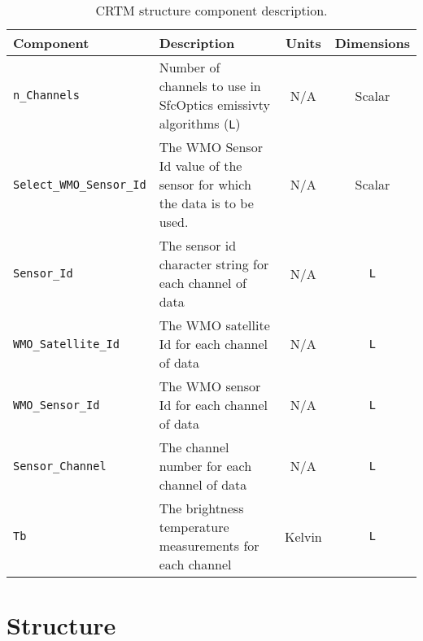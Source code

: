 \begin{table}[htp]
  \centering
  \begin{tabular}{l p{7cm} c c}
    \hline
    \sffamily\textbf{Component} & \sffamily\textbf{Description} & \sffamily\textbf{Units} & \sffamily\textbf{Dimensions} \\
    \hline\hline
    \texttt{n\_Channels} & Number of channels to use in SfcOptics emissivty algorithms (\texttt{L}) & N/A & Scalar \\
    \texttt{Select\_WMO\_Sensor\_Id} & The WMO Sensor Id value of the sensor for which the data is to be used. & N/A & Scalar \\
    \texttt{Sensor\_Id} & The sensor id character string for each channel of data & N/A & \texttt{L} \\
    \texttt{WMO\_Satellite\_Id} & The WMO satellite Id for each channel of data & N/A & \texttt{L} \\
    \texttt{WMO\_Sensor\_Id} & The WMO sensor Id for each channel of data & N/A & \texttt{L} \\
    \texttt{Sensor\_Channel} & The channel number for each channel of data & N/A & \texttt{L} \\
    \texttt{Tb} & The brightness temperature measurements for each channel & Kelvin & \texttt{L} \\
    \hline
  \end{tabular}
  \caption{CRTM \SensorData{} structure component description.}
  \label{tab:sensordata_structure}
\end{table}



\clearpage
\section{\GeometryInfo{} Structure}
\label{sec:geometryinfo_structure}

